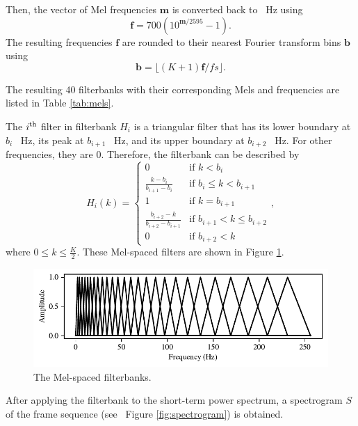 			Then, the vector of Mel frequencies $\mathbf{m}$ is converted back to \SI{}{\Hz} using
			\begin{equation}
				\mathbf{f} = 700\left(10^{\mathbf{m}/2595}-1\right).
			\end{equation}
			The resulting frequencies $\mathbf{f}$ are rounded to their nearest Fourier transform bins $\mathbf{b}$ using
			\begin{equation}
				\mathbf{b} = \lfloor(K+1)\mathbf{f}/fs\rfloor.
			\end{equation}

			The resulting 40 filterbanks with their corresponding Mels and frequencies are listed in Table \ref{tab:mels}.

			The $i\textsuperscript{th}$ filter in filterbank $H_i$ is a triangular filter that has its lower boundary at $b_{i}$ \SI{}{\Hz}, its peak at $b_{i+1}$ \SI{}{\Hz}, and its upper boundary at $b_{i+2}$ \SI{}{\Hz}.
			For other frequencies, they are 0.
			Therefore, the filterbank can be described by
			\begin{equation}
				H_i(k) = \begin{cases}
					0 & \mbox{if } k<b_i\\
					\frac{k-b_i}{b_{i+1}-b_i} & \mbox{if } b_i\leq k < b_{i+1} \\
					1 & \mbox{if } k = b_{i+1} \\
					\frac{b_{i+2} - k}{b_{i+2}-b_{i+1}} & \mbox{if } b_{i+1} < k \leq b_{i+2}\\
					0 & \mbox{if } b_{i+2} < k
				\end{cases},
			\end{equation}
			where $0 \leq k \leq \frac{K}{2}$.
			These Mel-spaced filters are shown in Figure \ref{fig:filterbank}.
			\begin{figure}[ht]
				\centering
			    \includegraphics[width=\linewidth]{gfx/fbanks}
			    \caption[Mel-spaced filterbanks]{The Mel-spaced filterbanks.}
			    \label{fig:filterbank}
			\end{figure}

			After applying the filterbank to the short-term power spectrum, a spectrogram $S$ of the frame sequence (see \eg~Figure \ref{fig:spectrogram}) is obtained.

